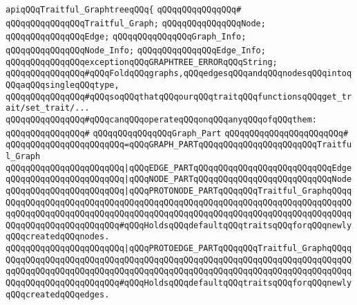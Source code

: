 \newline
\verb|apiqQQqTraitful_GraphtreeqQQq{|\newline
\verb|qQQqqQQqqQQqqQQq#|\newline
\verb|qQQqqQQqqQQqqQQqTraitful_Graph;|\newline
\verb|qQQqqQQqqQQqqQQqNode;|\newline
\verb|qQQqqQQqqQQqqQQqEdge;|\newline
\newline
\verb|qQQqqQQqqQQqqQQqGraph_Info;|\newline
\verb|qQQqqQQqqQQqqQQqNode_Info;|\newline
\verb|qQQqqQQqqQQqqQQqEdge_Info;|\newline
\newline
\verb|qQQqqQQqqQQqqQQqexceptionqQQqGRAPHTREE_ERRORqQQqString;|\newline
\newline
\verb|qQQqqQQqqQQqqQQq#qQQqFoldqQQqgraphs,qQQqedgesqQQqandqQQqnodesqQQqintoqQQqaqQQqsingleqQQqtype,|\newline
\verb|qQQqqQQqqQQqqQQq#qQQqsoqQQqthatqQQqourqQQqtraitqQQqfunctionsqQQqget_trait/set_trait/...|\newline
\verb|qQQqqQQqqQQqqQQq#qQQqcanqQQqoperateqQQqonqQQqanyqQQqofqQQqthem:|\newline
\verb|qQQqqQQqqQQqqQQq#|\newline
\verb|qQQqqQQqqQQqqQQqGraph_Part|\newline
\verb|qQQqqQQqqQQqqQQqqQQqqQQq#|\newline
\verb|qQQqqQQqqQQqqQQqqQQqqQQq=qQQqGRAPH_PARTqQQqqQQqqQQqqQQqqQQqqQQqTraitful_Graph|\newline
\verb|qQQqqQQqqQQqqQQqqQQqqQQq|\verb#|qQQqEDGE_PARTqQQqqQQqqQQqqQQqqQQqqQQqqQQqEdge#\newline
\verb|qQQqqQQqqQQqqQQqqQQqqQQq|\verb#|qQQqNODE_PARTqQQqqQQqqQQqqQQqqQQqqQQqqQQqNode#\newline
\verb|qQQqqQQqqQQqqQQqqQQqqQQq|\verb#|qQQqPROTONODE_PARTqQQqqQQqTraitful_GraphqQQqqQQqqQQqqQQqqQQqqQQqqQQqqQQqqQQqqQQqqQQqqQQqqQQqqQQqqQQqqQQqqQQqqQQqqQQqqQQqqQQqqQQqqQQqqQQqqQQqqQQqqQQqqQQqqQQqqQQqqQQqqQQqqQQqqQQqqQQqqQQqqQQqqQQqqQQqqQQqqQQqqQQq#\verb|#qQQqHoldsqQQqdefaultqQQqtraitsqQQqforqQQqnewlyqQQqcreatedqQQqnodes.|\newline
\verb|qQQqqQQqqQQqqQQqqQQqqQQq|\verb#|qQQqPROTOEDGE_PARTqQQqqQQqTraitful_GraphqQQqqQQqqQQqqQQqqQQqqQQqqQQqqQQqqQQqqQQqqQQqqQQqqQQqqQQqqQQqqQQqqQQqqQQqqQQqqQQqqQQqqQQqqQQqqQQqqQQqqQQqqQQqqQQqqQQqqQQqqQQqqQQqqQQqqQQqqQQqqQQqqQQqqQQqqQQqqQQqqQQqqQQq#\verb|#qQQqHoldsqQQqdefaultqQQqtraitsqQQqforqQQqnewlyqQQqcreatedqQQqedges.|\newline
